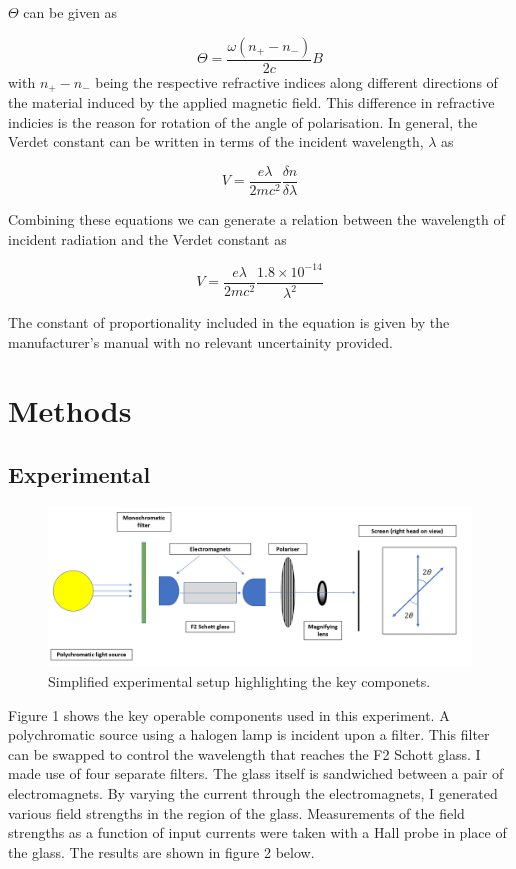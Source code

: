 \documentclass{article}%
\begin{document}
$\Theta$ can be given as 

\begin{equation}
    \Theta = \frac{\omega (n_{+} - n_{-})}{2c} B
\end{equation}
with $n_{+} - n_{-}$ being the respective refractive indices along different directions of the material induced by the applied magnetic field.
This difference in refractive indicies is the reason for rotation of the angle of polarisation.
In general, the Verdet constant can be written in terms of the incident wavelength, $\lambda$ as

\begin{equation}
    V = \frac{e\lambda}{2mc^{2}} \frac{\delta n}{\delta \lambda}
\end{equation}

Combining these equations we can generate a relation between the wavelength of incident radiation and the Verdet constant as 

\begin{equation}
    V = \frac{e\lambda}{2mc^{2}} \frac{1.8 \times 10^{-14}}{\lambda^{2}}
\end{equation}

The constant of proportionality included in the equation is given by the manufacturer's manual with no relevant uncertainity provided. \cite{Lab}
\section{Methods}

\subsection{Experimental}
\begin{figure}[H]%
    \centering%
    \includegraphics[width=500px]{setup.png}%
    \caption{Simplified experimental setup highlighting the key componets.}%
\end{figure}

Figure 1 shows the key operable components used in this experiment. A polychromatic source using a halogen lamp is incident upon a filter. This filter can be swapped to control the wavelength that reaches the F2 Schott glass. I made use of four separate filters. 
The glass itself is sandwiched between a pair of electromagnets. By varying the current through the electromagnets, I generated various field strengths in the region of the glass. Measurements of the field strengths as a function of input currents were taken with a Hall probe in place of the glass. The results are shown in figure 2 below.
\end{document}
